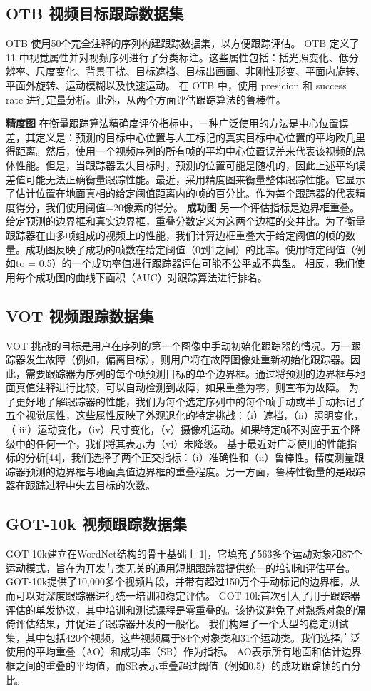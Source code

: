 \subsection{OTB 视频目标跟踪数据集}
OTB 使用50个完全注释的序列构建跟踪数据集，以方便跟踪评估。
OTB 定义了 11 中视觉属性并对视频序列进行了分类标注。这些属性包括：括光照变化、低分辨率、尺度变化、背景干扰、目标遮挡、目标出画面、非刚性形变、平面内旋转、平面外旋转、运动模糊以及快速运动。
在 OTB 中，使用 presicion 和 success rate 进行定量分析。此外，从两个方面评估跟踪算法的鲁棒性。

\textbf{精度图} 在衡量跟踪算法精确度评价指标中，一种广泛使用的方法是中心位置误差，其定义是：预测的目标中心位置与人工标记的真实目标中心位置的平均欧几里得距离。然后，使用一个视频序列的所有帧的平均中心位置误差来代表该视频的总体性能。但是，当跟踪器丢失目标时，预测的位置可能是随机的，因此上述平均误差值可能无法正确衡量跟踪性能。最近，采用精度图来衡量整体跟踪性能。它显示了估计位置在地面真相的给定阈值距离内的帧的百分比。作为每个跟踪器的代表精度得分，我们使用阈值=20像素的得分。
\textbf{成功图} 另一个评估指标是边界框重叠。给定预测的边界框和真实边界框，重叠分数定义为这两个边框的交并比。为了衡量跟踪器在由多帧组成的视频上的性能，我们计算边框重叠大于给定阈值的帧的数量。成功图反映了成功的帧数在给定阈值（0到1之间）的比率。使用特定阈值（例如to = 0.5）的一个成功率值进行跟踪器评估可能不公平或不典型。 相反，我们使用每个成功图的曲线下面积（AUC）对跟踪算法进行排名。

\subsection{VOT 视频跟踪数据集}
VOT 挑战的目标是用户在序列的第一个图像中手动初始化跟踪器的情况。万一跟踪器发生故障（例如，偏离目标），则用户将在故障图像处重新初始化跟踪器。因此，需要跟踪器为序列的每个帧预测目标的单个边界框。通过将预测的边界框与地面真值注释进行比较，可以自动检测到故障，如果重叠为零，则宣布为故障。
为了更好地了解跟踪器的性能，我们为每个选定序列中的每个帧手动或半手动标记了五个视觉属性，这些属性反映了外观退化的特定挑战：（i）遮挡，（ii）照明变化，（ iii）运动变化，（iv）尺寸变化，（v）摄像机运动。如果特定帧不对应于五个降级中的任何一个，我们将其表示为（vi）未降级。
基于最近对广泛使用的性能指标的分析[44]，我们选择了两个正交指标：（i）准确性和（ii）鲁棒性。精度测量跟踪器预测的边界框与地面真值边界框的重叠程度。另一方面，鲁棒性衡量的是跟踪器在跟踪过程中失去目标的次数。

\subsection{GOT-10k 视频跟踪数据集}
GOT-10k建立在WordNet结构的骨干基础上[1]，它填充了563多个运动对象和87个运动模式，旨在为开发与类无关的通用短期跟踪器提供统一的培训和评估平台。
GOT-10k提供了10,000多个视频片段，并带有超过150万个手动标记的边界框，从而可以对深度跟踪器进行统一培训和稳定评估。
GOT-10k首次引入了用于跟踪器评估的单发协议，其中培训和测试课程是零重叠的。该协议避免了对熟悉对象的偏倚评估结果，并促进了跟踪器开发的一般化。
我们构建了一个大型的稳定测试集，其中包括420个视频，这些视频属于84个对象类和31个运动类。我们选择广泛使用的平均重叠（AO）和成功率（SR）作为指标。 AO表示所有地面和估计边界框之间的重叠的平均值，而SR表示重叠超过阈值（例如0.5）的成功跟踪帧的百分比。